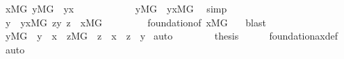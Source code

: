 \begin{isabellebody}
\ {\isachardoublequoteopen}x{\isasymin}M{\isacharbrackleft}{\kern0pt}G{\isacharbrackright}{\kern0pt}{\isachardoublequoteclose}\ {\isachardoublequoteopen}{\isasymexists}y{\isasymin}M{\isacharbrackleft}{\kern0pt}G{\isacharbrackright}{\kern0pt}\ {\isachardot}{\kern0pt}\ y{\isasymin}x{\isachardoublequoteclose}\isanewline
\ \ \ \ \isamarkupfalse%
\ \isanewline
\ \ \ \ \isamarkupfalse%
\ {\isachardoublequoteopen}{\isasymexists}y{\isasymin}M{\isacharbrackleft}{\kern0pt}G{\isacharbrackright}{\kern0pt}\ {\isachardot}{\kern0pt}\ y{\isasymin}x{\isasyminter}M{\isacharbrackleft}{\kern0pt}G{\isacharbrackright}{\kern0pt}{\isachardoublequoteclose}\ \isamarkupfalse%
\ simp\isanewline
\ \ \ \ \isamarkupfalse%
\ \isanewline
\ \ \ \ \isamarkupfalse%
\ y\ \ {\isachardoublequoteopen}y{\isasymin}x{\isasyminter}M{\isacharbrackleft}{\kern0pt}G{\isacharbrackright}{\kern0pt}{\isachardoublequoteclose}\ {\isachardoublequoteopen}{\isasymforall}z{\isasymin}y{\isachardot}{\kern0pt}\ z\ {\isasymnotin}\ x{\isasyminter}M{\isacharbrackleft}{\kern0pt}G{\isacharbrackright}{\kern0pt}{\isachardoublequoteclose}\ \isanewline
\ \ \ \ \ \ \isamarkupfalse%
\ foundation{\isacharbrackleft}{\kern0pt}of\ {\isachardoublequoteopen}x{\isasyminter}M{\isacharbrackleft}{\kern0pt}G{\isacharbrackright}{\kern0pt}{\isachardoublequoteclose}{\isacharbrackright}{\kern0pt}\ \ \isamarkupfalse%
\ blast\isanewline
\ \ \ \ \isamarkupfalse%
\ \isanewline
\ \ \ \ \isamarkupfalse%
\ {\isachardoublequoteopen}{\isasymexists}y{\isasymin}M{\isacharbrackleft}{\kern0pt}G{\isacharbrackright}{\kern0pt}\ {\isachardot}{\kern0pt}\ y\ {\isasymin}\ x\ {\isasymand}\ {\isacharparenleft}{\kern0pt}{\isasymforall}z{\isasymin}M{\isacharbrackleft}{\kern0pt}G{\isacharbrackright}{\kern0pt}\ {\isachardot}{\kern0pt}\ z\ {\isasymnotin}\ x\ {\isasymor}\ z\ {\isasymnotin}\ y{\isacharparenright}{\kern0pt}{\isachardoublequoteclose}\isamarkupfalse%
\ auto\isanewline
\ \ \isacommand{{\isacharbraceright}{\kern0pt}}\isamarkupfalse%
\isanewline
\ \ \isamarkupfalse%
\ \isamarkupfalse%
\ {\isacharquery}{\kern0pt}thesis\isanewline
\ \ \ \ \isamarkupfalse%
\ foundation{\isacharunderscore}{\kern0pt}ax{\isacharunderscore}{\kern0pt}def\ \isamarkupfalse%
\ auto\isanewline
{}\isamarkupfalse%
%
\endisatagproof
{\isafoldproof}%
%
\isadelimproof
\isanewline
%
\endisadelimproof
\ \ \ \ \isanewline
{}\isamarkupfalse%
\ \ \isanewline
%
\isadelimtheory
%
\endisadelimtheory
%
\isatagtheory
{}\isamarkupfalse%
%
\endisatagtheory
{\isafoldtheory}%
%
\isadelimtheory
%
\endisadelimtheory
%
\end{isabellebody}%
